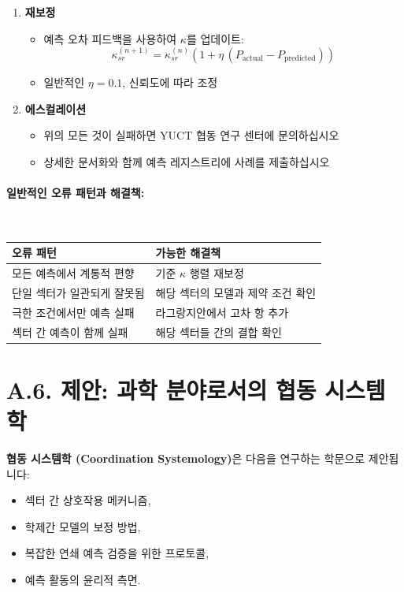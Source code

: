 \documentclass[13pt,a4paper]{article}
\begin{document}
\begin{enumerate}
		\item \textbf{재보정}
		\begin{itemize}
			\item 예측 오차 피드백을 사용하여 $\kappa$를 업데이트:
			\[
			\kappa_{sr}^{(n+1)} = \kappa_{sr}^{(n)}\left(1+\eta\,(P_{\mathrm{actual}}-P_{\mathrm{predicted}})\right)
			\]
			\item 일반적인 $\eta = 0.1$, 신뢰도에 따라 조정
		\end{itemize}
		
		\item \textbf{에스컬레이션}
		\begin{itemize}
			\item 위의 모든 것이 실패하면 YUCT 협동 연구 센터에 문의하십시오
			\item 상세한 문서화와 함께 예측 레지스트리에 사례를 제출하십시오
		\end{itemize}
	\end{enumerate}
	
	\paragraph*{일반적인 오류 패턴과 해결책:} \
	
	\begin{tabularx}{\textwidth}{|l|X|}
		\hline
		\textbf{오류 패턴} & \textbf{가능한 해결책} \\
		\hline
		모든 예측에서 계통적 편향 & 기준 $\kappa$ 행렬 재보정 \\
		\hline
		단일 섹터가 일관되게 잘못됨 & 해당 섹터의 모델과 제약 조건 확인 \\
		\hline
		극한 조건에서만 예측 실패 & 라그랑지안에서 고차 항 추가 \\
		\hline
		섹터 간 예측이 함께 실패 & 해당 섹터들 간의 결합 확인 \\
		\hline
	\end{tabularx}
	
	\section*{A.6. 제안: 과학 분야로서의 협동 시스템학}
	
	\textbf{협동 시스템학 (Coordination Systemology)}은 다음을 연구하는 학문으로 제안됩니다:
	\begin{itemize}[leftmargin=*]
		\item 섹터 간 상호작용 메커니즘,
		\item 학제간 모델의 보정 방법,
		\item 복잡한 연쇄 예측 검증을 위한 프로토콜,
		\item 예측 활동의 윤리적 측면.
	\end{itemize}
	
\end{document}
